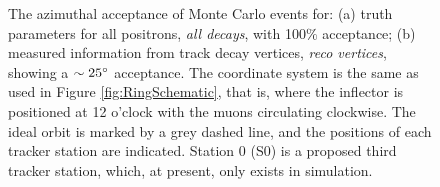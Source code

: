\begin{figure}[t!]
\centering{}
\caption{The azimuthal acceptance of Monte Carlo events for: (a) truth parameters for all positrons, \textit{all decays}, with 100$\%$ acceptance; (b) measured information from track decay vertices, \textit{reco vertices}, showing a $\sim25\degree$ acceptance. The coordinate system is the same as used in Figure \ref{fig:RingSchematic}, that is, where the inflector is positioned at 12 o'clock with the muons circulating clockwise. The ideal orbit is marked by a grey dashed line, and the positions of each tracker station are indicated. Station 0 (S0) is a proposed third tracker station, which, at present, only exists in simulation.}
\label{fig:SimAzimuthalAcceptance}
\end{figure} 


